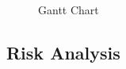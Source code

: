 \documentclass[runningheads]{llncs}
\begin{document}
\begin{figure}[tbp]
\begin{sideways}
\begin{ganttchart}
                    

                \end{ganttchart}
            \end{sideways}
        \caption{Gantt Chart}
        \end{figure}
    \subsection{Risk Analysis}

\newpage
\printbibliography
{}
\end{document}
